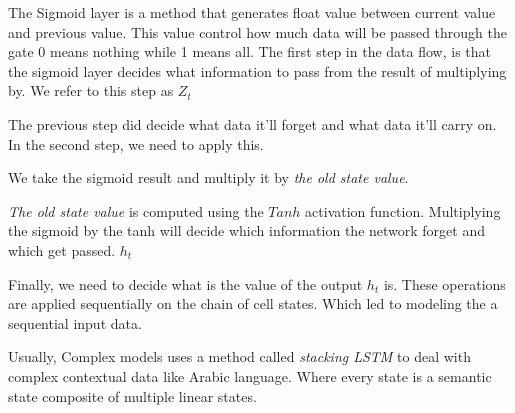 \vspace{0.5cm}

The Sigmoid layer is a method that generates float value between current value and previous value. This value control how much data will be passed through the gate 0 means nothing while 1 means all.
The first step in the data flow, is that the sigmoid layer decides what information to pass from the result of multiplying by. We refer to this step as $Z_t$

The previous step did decide what data it’ll forget and what data it’ll carry on. In the second step, we need to apply this.

We take the sigmoid result and multiply it by \textit{the old state value}.

\textit{The old state value} is computed using the $Tanh$ activation function. 
Multiplying the sigmoid by the tanh will decide which information the network forget and which get passed. $h^{~}_t$

\vspace{0.5cm}
Finally, we need to decide what is the value of the output $h_t$ is.
These operations are applied sequentially on the chain of cell states. Which led to modeling the a sequential input data.

Usually, Complex models uses a method called \textit{stacking LSTM} to deal with complex contextual data like Arabic language. Where every state is a semantic state composite of multiple linear states.
